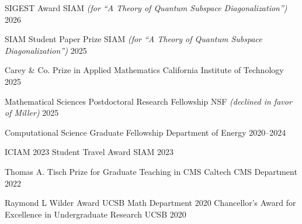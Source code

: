 
\begin{cvhonors}

   \cvhonor
    {SIGEST Award} %
    {SIAM \textit{(for ``A Theory of Quantum Subspace Diagonalization'')}} %
    {} %
    {2026} %

   \cvhonor
    {SIAM Student Paper Prize} %
    {SIAM \textit{(for ``A Theory of Quantum Subspace Diagonalization'')}} %
    {} %
    {2025} %
   
   \cvhonor
    {Carey \& Co. Prize in Applied Mathematics} %
    {California Institute of Technology} %
    {} %
    {2025} %
    
  \cvhonor
  {Mathematical Sciences Postdoctoral Research Fellowship}
  {NSF \textit{(declined in favor of Miller)}}
  {}
  {2025}
    
  \cvhonor
    {Computational Science Graduate Fellowship} %
    {Department of Energy} %
    {} %
    {2020--2024} %

    \cvhonor
    {ICIAM 2023 Student Travel Award} %
    {SIAM} %
    {} %
    {2023} %

  \cvhonor
    {Thomas A. Tisch Prize for Graduate Teaching in CMS} %
    {Caltech CMS Department} %
    {} %
    {2022} %

  \cvhonor
    {Raymond L Wilder Award} %
    {UCSB Math Department} %
    {} %
    {2020} %
  \cvhonor
    {Chancellor's Award for Excellence in Undergraduate Research} %
    {UCSB} %
    {} %
    {2020} %


\end{cvhonors}
